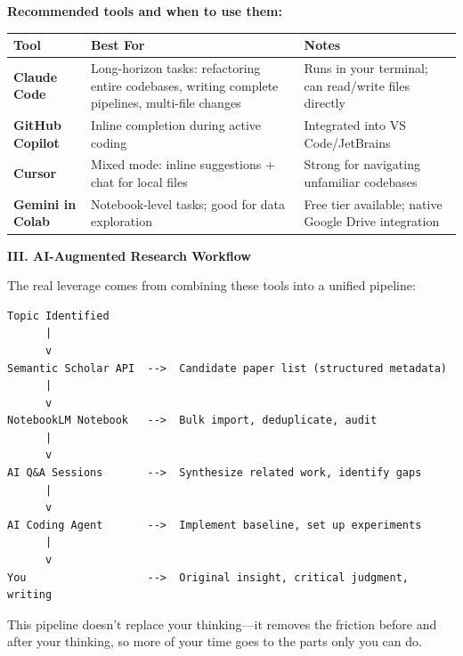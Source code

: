 \documentclass[11pt,a4paper]{article}
\begin{document}
\textbf{Recommended tools and when to use them:}

\begin{table}[H]
\centering
\small
\begin{tabular}{@{}p{2.8cm}p{4.5cm}p{5cm}@{}}
\toprule
\textbf{Tool} & \textbf{Best For} & \textbf{Notes} \\
\midrule
\textbf{Claude Code} & Long-horizon tasks: refactoring entire codebases, writing complete pipelines, multi-file changes & Runs in your terminal; can read/write files directly \\
\textbf{GitHub Copilot} & Inline completion during active coding & Integrated into VS Code/JetBrains \\
\textbf{Cursor} & Mixed mode: inline suggestions + chat for local files & Strong for navigating unfamiliar codebases \\
\textbf{Gemini in Colab} & Notebook-level tasks; good for data exploration & Free tier available; native Google Drive integration \\
\bottomrule
\end{tabular}
\end{table}

\textbf{III. AI-Augmented Research Workflow}

The real leverage comes from combining these tools into a unified pipeline:

\begin{verbatim}
Topic Identified
      |
      v
Semantic Scholar API  -->  Candidate paper list (structured metadata)
      |
      v
NotebookLM Notebook   -->  Bulk import, deduplicate, audit
      |
      v
AI Q&A Sessions       -->  Synthesize related work, identify gaps
      |
      v
AI Coding Agent       -->  Implement baseline, set up experiments
      |
      v
You                   -->  Original insight, critical judgment, writing
\end{verbatim}

This pipeline doesn't replace your thinking---it removes the friction before and after your thinking, so more of your time goes to the parts only you can do.
\end{document}
